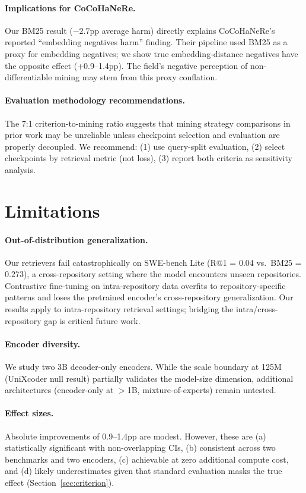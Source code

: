 \documentclass[11pt,a4paper]{article}
\begin{document}
\paragraph{Implications for CoCoHaNeRe.} Our BM25 result ($-2.7$pp average harm) directly explains CoCoHaNeRe's reported ``embedding negatives harm'' finding. Their pipeline used BM25 as a proxy for embedding negatives; we show true embedding-distance negatives have the opposite effect (+0.9--1.4pp). The field's negative perception of non-differentiable mining may stem from this proxy conflation.

\paragraph{Evaluation methodology recommendations.} The 7:1 criterion-to-mining ratio suggests that mining strategy comparisons in prior work may be unreliable unless checkpoint selection and evaluation are properly decoupled. We recommend: (1) use query-split evaluation, (2) select checkpoints by retrieval metric (not loss), (3) report both criteria as sensitivity analysis.

\section{Limitations}

\paragraph{Out-of-distribution generalization.} Our retrievers fail catastrophically on SWE-bench Lite (R@1 = 0.04 vs.\ BM25 = 0.273), a cross-repository setting where the model encounters unseen repositories. Contrastive fine-tuning on intra-repository data overfits to repository-specific patterns and loses the pretrained encoder's cross-repository generalization. Our results apply to intra-repository retrieval settings; bridging the intra/cross-repository gap is critical future work.

\paragraph{Encoder diversity.} We study two 3B decoder-only encoders. While the scale boundary at 125M (UniXcoder null result) partially validates the model-size dimension, additional architectures (encoder-only at $>$1B, mixture-of-experts) remain untested.

\paragraph{Effect sizes.} Absolute improvements of 0.9--1.4pp are modest. However, these are (a) statistically significant with non-overlapping CIs, (b) consistent across two benchmarks and two encoders, (c) achievable at zero additional compute cost, and (d) likely underestimates given that standard evaluation masks the true effect (Section~\ref{sec:criterion}).
\end{document}
